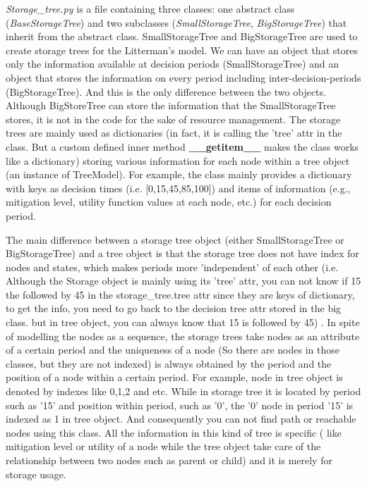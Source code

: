 \documentclass[12pt]{article}
\begin{document}
\textit{Storage\_tree.py} is a file containing three classes: one abstract class (\textit{BaseStorageTree}) and two subclasses (\textit{SmallStorageTree}, \textit{BigStorageTree}) that inherit from the abstract class. SmallStorageTree and BigStorageTree are used to create storage trees for the Litterman's model. We can have an object that stores only the information available at decision periods (SmallStorageTree) and an object that stores the information on every period including inter-decision-periods (BigStorageTree). And this is the only difference between the two objects. Although BigStoreTree can store the information that the SmallStorageTree stores, it is not in the code for the sake of resource management. The storage trees are mainly used as dictionaries (in fact, it is calling the 'tree' attr in the class. But a custom defined inner method \textbf{\_\_getitem\_\_} makes the class works like a dictionary) storing various information for each node within a tree object (an instance of TreeModel). For example, the class mainly provides a dictionary with keys as decision times (i.e. [0,15,45,85,100]) and items of information (e.g., mitigation level, utility function values at each node, etc.) for each decision period.

The main difference between a storage tree object (either SmallStorageTree or BigStorageTree) and a tree object is that the storage tree does not have index for nodes and states, which makes periods more 'independent' of each other (i.e. Although the Storage object is mainly using its 'tree' attr, you can not know if 15 the followed by 45 in the storage\_tree.tree attr since they are keys of dictionary, to get the info, you need to go back to the decision tree attr stored in the big class. but in tree object, you can always know that 15 is followed by 45) . In spite of modelling the nodes as a sequence, the storage trees take nodes as an attribute of a certain period and the uniqueness of a node (So there are nodes in those classes, but they are not indexed) is always obtained by the period and the position of a node within a certain period. For example, node in tree object is denoted by indexes like 0,1,2 and etc. While in storage tree it is located by period such as '15' and position within period, such as '0', the '0' node in period '15' is indexed as 1 in tree object. And consequently you can not find path or reachable nodes using this class.  All the information in this kind of tree is specific ( like mitigation level or utility of a node while the tree object take care of the relationship between two nodes such as parent or child) and it is merely for storage usage.
\end{document}
